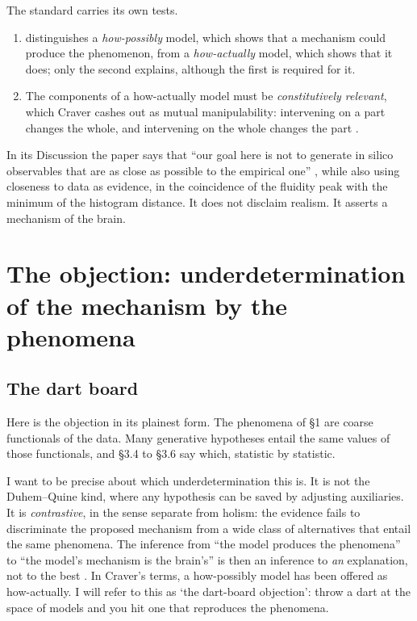 \documentclass[11pt]{article}
\begin{document}
The standard carries its own tests.
\begin{enumerate}
\item \textcite{craver2006} distinguishes a \emph{how-possibly} model, which shows that a mechanism could produce the phenomenon, from a \emph{how-actually} model, which shows that it does; only the second explains, although the first is required for it.
\item The components of a how-actually model must be \emph{constitutively relevant}, which Craver cashes out as mutual manipulability: intervening on a part changes the whole, and intervening on the whole changes the part \parencite{craver2007}.
\end{enumerate}
In its Discussion the paper says that ``our goal here is not to generate in silico observables that are as close as possible to the empirical one'' \parencite[Discussion]{fousek2024}, while also using closeness to data as evidence, in the coincidence of the fluidity peak with the minimum of the histogram distance. It does not disclaim realism. It asserts a mechanism of the brain.

\section{The objection: underdetermination of the mechanism by the phenomena}
\subsection{The dart board}
Here is the objection in its plainest form. The phenomena of \S1 are coarse functionals of the data. Many generative hypotheses entail the same values of those functionals, and \S3.4 to \S3.6 say which, statistic by statistic.

I want to be precise about which underdetermination this is. It is not the Duhem--Quine kind, where any hypothesis can be saved by adjusting auxiliaries. It is \emph{contrastive}, in the sense \textcite{laudan1991} separate from holism: the evidence fails to discriminate the proposed mechanism from a wide class of alternatives that entail the same phenomena. The inference from ``the model produces the phenomena'' to ``the model's mechanism is the brain's'' is then an inference to \emph{an} explanation, not to the best \parencite{lipton2004}. In Craver's terms, a how-possibly model has been offered as how-actually. I will refer to this as `the dart-board objection': throw a dart at the space of models and you hit one that reproduces the phenomena.
\end{document}
